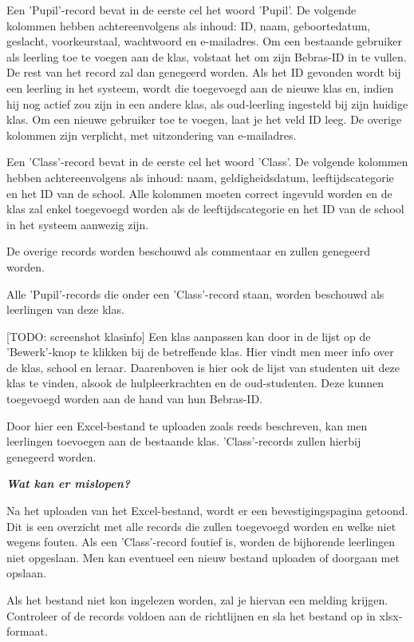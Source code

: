 \documentclass[]{article}
\begin{document}
Een 'Pupil'-record bevat in de eerste cel het woord 'Pupil'. De volgende kolommen hebben achtereenvolgens als inhoud: ID, naam, geboortedatum, geslacht, voorkeurstaal, wachtwoord en e-mailadres. Om een bestaande gebruiker als leerling toe te voegen aan de klas, volstaat het om zijn Bebras-ID in te vullen. De rest van het record zal dan genegeerd worden. Als het ID gevonden wordt bij een leerling in het systeem, wordt die toegevoegd aan de nieuwe klas en, indien hij nog actief zou zijn in een andere klas, als oud-leerling ingesteld bij zijn huidige klas.  
Om een nieuwe gebruiker toe te voegen, laat je het veld ID leeg. De overige kolommen zijn verplicht, met uitzondering van e-mailadres.

Een 'Class'-record bevat in de eerste cel het woord 'Class'. De volgende kolommen hebben achtereenvolgens als inhoud: naam, geldigheidsdatum, leeftijdscategorie en het ID van de school. Alle kolommen moeten correct ingevuld worden en de klas zal enkel toegevoegd worden als de leeftijdscategorie en het ID van de school in het systeem aanwezig zijn. 

De overige records worden beschouwd als commentaar en zullen genegeerd worden.

Alle 'Pupil'-records die onder een 'Class'-record staan, worden beschouwd als leerlingen van deze klas. 

[TODO: screenshot klasinfo]
Een klas aanpassen kan door in de lijst op de 'Bewerk'-knop te klikken bij de betreffende klas. Hier vindt men meer info over de klas, school en leraar. Daarenboven is hier ook de lijst van studenten uit deze klas te vinden, alsook de hulpleerkrachten en de oud-studenten. Deze kunnen toegevoegd worden aan de hand van hun Bebras-ID.

Door hier een Excel-bestand te uploaden zoals reeds beschreven, kan men leerlingen toevoegen aan de bestaande klas. 'Class'-records zullen hierbij genegeerd worden.

\textbf{\textit{Wat kan er mislopen?}}

Na het uploaden van het Excel-bestand, wordt er een bevestigingspagina getoond. Dit is een overzicht met alle records die zullen toegevoegd worden en welke niet wegens fouten. Als een 'Class'-record foutief is, worden de bijhorende leerlingen niet opgeslaan. Men kan eventueel een nieuw bestand uploaden of doorgaan met opslaan.

Als het bestand niet kon ingelezen worden, zal je hiervan een melding krijgen. Controleer of de records voldoen aan de richtlijnen en sla het bestand op in xlsx-formaat.
\end{document}
